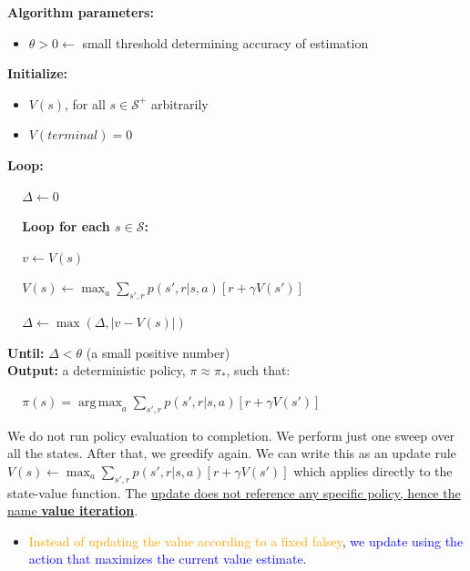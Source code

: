 \documentclass[12pt, a4paper]{article}
\DeclareMathOperator*{\argmax}{arg\,max} %
\begin{document}
\begin{tcolorbox}[title={Value Iteration, for estimating  $\pi \approx \pi_*$}]

  \textbf{Algorithm parameters:}
  \begin{itemize}
    \item $\theta > 0 \leftarrow$ small threshold determining accuracy of estimation
  \end{itemize}

  \textbf{Initialize:}
  \begin{itemize}
    \item $V(s)$, for all $s \in \mathcal{S}^+$ arbitrarily
    \item $V(terminal) = 0$
  \end{itemize}


  \textbf{Loop:}
  \begin{description}
      \item $\;\;\;$ $\Delta \leftarrow 0$
      \item $\;\;\;$ \textbf{Loop for each $s \in \mathcal{S}$:}
      \begin{description}
        \item $\;\;\;$ $v \leftarrow V(s)$
        \item $\;\;\;$ $V(s) \leftarrow \max_a \sum_{s', r} p(s',r|s,a) [r + \gamma V(s')]$
        \item $\;\;\;$ $\Delta \leftarrow \max (\Delta , | v - V(s) |)$
      \end{description}
  \end{description}
  \textbf{Until:} $\Delta < \theta$ (a small positive number) \\

  \textbf{Output:} a deterministic policy, $\pi \approx \pi_*$, such that:
  \begin{description}
      \item $\;\;\;$ $\pi(s) = \argmax_a \sum_{s',r} p(s',r|s,a)[r+\gamma V(s')]$
  \end{description}
\end{tcolorbox}


We do not run policy evaluation to completion. We perform just one sweep over all the states. After that, we greedify again. We can write this as an update rule $V(s) \leftarrow \max_a \sum_{s', r} p(s',r|s,a) [r + \gamma V(s')]$ which applies directly to the state-value function. The \uline{update does not reference any specific policy, hence the name \textbf{value iteration}}.

\begin{itemize}
  \item \textcolor{Orange}{Instead of updating the value according to a fixed falsey}, \textcolor{blue}{we update using the action that maximizes the current value estimate}.
\end{itemize}
\end{document}

